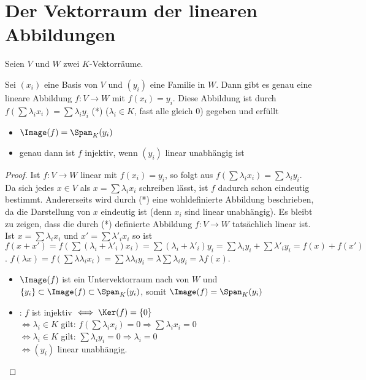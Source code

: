 \section{Der Vektorraum der linearen Abbildungen}

Seien $V$ und $W$ zwei $K$-Vektorräume.

\begin{proposition}
	Sei $(x_i)$ eine Basis von $V$ und $(y_i)$ eine Familie in $W$. Dann gibt es genau eine lineare 
	Abbildung $f:V\to W$ mit $f(x_i)=y_i$. Diese Abbildung ist durch $f(\sum \lambda_ix_i)=\sum \lambda_iy_i$ 
	(*) ($\lambda_i\in K$, fast alle gleich 0) gegeben und erfüllt
	\begin{itemize}
		\item $\Image(f)=\Span_K(y_i)$
		\item genau dann ist $f$ injektiv, wenn $(y_i)$ linear unabhängig ist
	\end{itemize}
\end{proposition}
\begin{proof}
	Ist $f:V\to W$ linear mit $f(x_i)=y_i$, so folgt aus  $f(\sum \lambda_ix_i)=\sum \lambda_iy_i$. Da sich jedes 
	$x\in V$ als $x=\sum  \lambda_ix_i$ schreiben lässt, ist $f$ dadurch schon eindeutig bestimmt. Andererseits wird 
	durch (*) eine wohldefinierte Abbildung beschrieben, da die Darstellung von $x$ eindeutig ist (denn $x_i$ sind 
	linear unabhängig). Es bleibt zu zeigen, dass die durch (*) definierte Abbildung $f:V\to W$ tatsächlich linear ist. 
	Ist $x=\sum \lambda_ix_i$ und $x'=\sum \lambda'_ix_i$ so ist $f(x+x')=f(\sum (\lambda_i+\lambda'_i)x_i)=
	\sum (\lambda_i+\lambda'_i)y_i=\sum \lambda_iy_i+\sum \lambda'_iy_i=f(x)+f(x')$. $f(\lambda x)=f(\sum \lambda
	\lambda_ix_i)=\sum \lambda\lambda_iy_i=\lambda\sum\lambda_iy_i=\lambda f(x)$.
	\begin{itemize}
		\item $\Image(f)$ ist ein Untervektorraum nach  von $W$ und $\{y_i\}\subset \Image(f)\subset \Span_K(y_i)$, somit $\Image(f)=\Span_K(y_i)$
		\item {}: $f$ ist injektiv $\iff \Ker(f)=\{0\}$ \\ 
		$\iff \lambda_i\in K$ gilt: $f(\sum \lambda_ix_i)=0\Rightarrow \sum \lambda_ix_i=0$ \\ 
		$\iff \lambda_i\in K$ gilt: $\sum\lambda_iy_i=0\Rightarrow \lambda_i=0$ \\ 
		$\iff (y_i)$ linear unabhängig.
	\end{itemize}
\end{proof}

